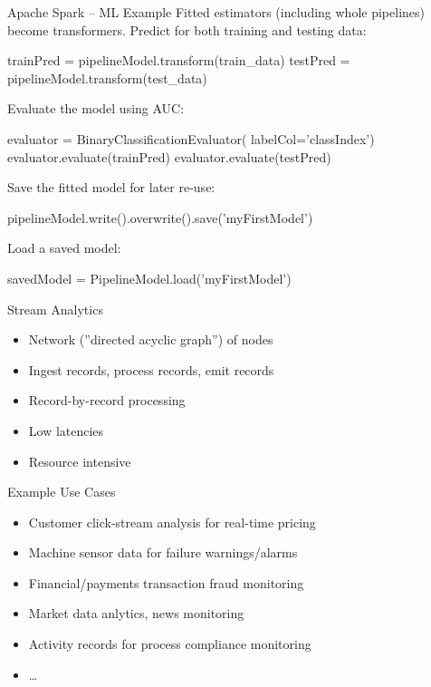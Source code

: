 \documentclass[ignorenonframetext,xcolor=x11names]{beamer}
\begin{document}
\begin{frame}[label=withcode,fragile]{Apache Spark -- ML Example}
Fitted estimators (including whole pipelines) become transformers. Predict for both training and testing data:
\begin{pythoncode}
trainPred = pipelineModel.transform(train_data)
testPred = pipelineModel.transform(test_data)
\end{pythoncode}
Evaluate the model using AUC:
\begin{pythoncode}
evaluator = BinaryClassificationEvaluator(
    labelCol='classIndex')
evaluator.evaluate(trainPred)
evaluator.evaluate(testPred)
\end{pythoncode}
Save the fitted model for later re-use:
\begin{pythoncode}
pipelineModel.write().overwrite().save('myFirstModel')
\end{pythoncode}
Load a saved model:
\begin{pythoncode}
savedModel = PipelineModel.load('myFirstModel')
\end{pythoncode}
\end{frame}


\begin{frame}[label=full]{Stream Analytics}
\begin{itemize}
    \item Network (''directed acyclic graph'') of nodes
    \item Ingest records, process records, emit records
    \item Record-by-record processing
    \item Low latencies
    \item Resource intensive
\end{itemize}
\begin{block}{Example Use Cases}
\begin{itemize}
   \item Customer click-stream analysis for real-time pricing
   \item Machine sensor data for failure warnings/alarms
   \item Financial/payments transaction fraud monitoring
   \item Market data anlytics, news monitoring
   \item Activity records for process compliance monitoring
   \item \ldots
\end{itemize}
\end{block}

\end{frame}
\end{document}
